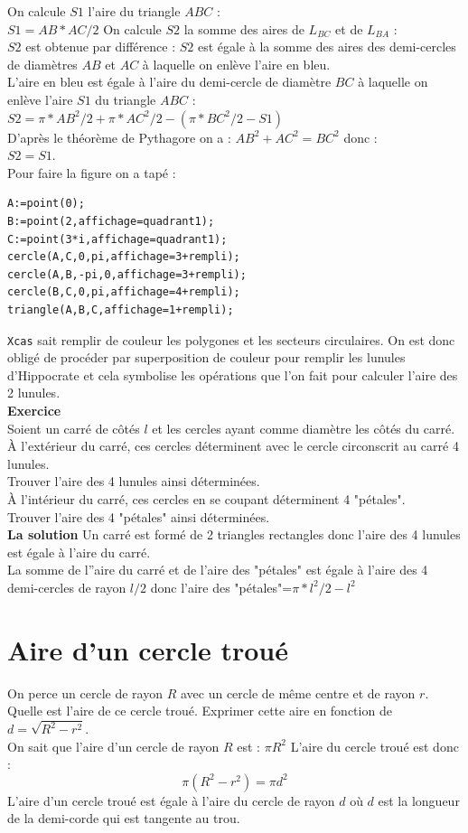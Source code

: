 \documentclass[a4paper,11pt]{book}
\begin{document}
On calcule $S1$ l'aire du triangle $ABC$ :\\
$S1=AB*AC/2$
On calcule $S2$ la somme des aires de $L_{BC}$ et de $L_{BA}$ :\\
$S2$ est obtenue par diff\'erence : $S2$ est \'egale \`a la somme des aires des
demi-cercles de diam\`etres $AB$ et $AC$ \`a laquelle on enl\`eve l'aire en 
bleu.\\
L'aire en bleu est \'egale \`a l'aire du demi-cercle de 
diam\`etre $BC$ \`a laquelle on enl\`eve l'aire $S1$ du triangle $ABC$ :\\
$S2=\pi*AB^2/2+\pi*AC^2/2-(\pi*BC^2/2-S1)$\\
D'apr\`es le th\'eor\`eme de Pythagore on a  : $AB^2+AC^2=BC^2$ donc :\\
$S2=S1$.\\
Pour faire la figure on a tap\'e :
\begin{verbatim}
A:=point(0);
B:=point(2,affichage=quadrant1);
C:=point(3*i,affichage=quadrant1);
cercle(A,C,0,pi,affichage=3+rempli);
cercle(A,B,-pi,0,affichage=3+rempli);
cercle(B,C,0,pi,affichage=4+rempli);
triangle(A,B,C,affichage=1+rempli);
\end{verbatim}
{\tt Xcas} sait remplir de couleur les polygones et les secteurs circulaires.
On est donc oblig\'e de proc\'eder par superposition de couleur pour remplir 
les lunules d'Hippocrate et cela symbolise les op\'erations que l'on fait pour 
calculer l'aire des 2 lunules.\\
{\bf Exercice}\\
Soient un carr\'e de c\^ot\'es $l$ et les cercles ayant comme 
diam\`etre les c\^ot\'es du carr\'e.\\
\`A l'ext\'erieur du carr\'e, ces cercles d\'eterminent avec le cercle 
circonscrit au carr\'e 4 lunules.\\
Trouver l'aire des 4 lunules ainsi d\'etermin\'ees.\\
\`A l'int\'erieur du carr\'e, ces cercles en se coupant d\'eterminent 4 
"p\'etales".\\
 Trouver l'aire des 4 "p\'etales" ainsi d\'etermin\'ees.\\
{\bf La solution}
Un carr\'e est form\'e de 2 triangles rectangles donc l'aire des 4 lunules est 
\'egale \`a l'aire du carr\'e.\\
La somme de l''aire du carr\'e et de  l'aire des "p\'etales" est \'egale \`a 
l'aire des 4 demi-cercles de rayon $l/2$ donc 
l'aire des "p\'etales"=$\pi*l^2/2-l^2$
\section{Aire d'un cercle trou\'e}
On perce un cercle de rayon $R$ avec un cercle de m\^eme centre et de rayon $r$. Quelle est l'aire de ce cercle trou\'e. Exprimer cette aire en fonction de  
$d=\sqrt{R^2-r^2}$.\\
On sait que l'aire d'un cercle de rayon $R$ est : $\pi R^2$
L'aire du cercle trou\'e est donc :
$$\pi(R^2-r^2)=\pi d^2$$
L'aire d'un cercle trou\'e est \'egale \`a l'aire du cercle de rayon $d$ o\`u 
$d$ est la longueur de la demi-corde qui est tangente au trou.
\end{document}
